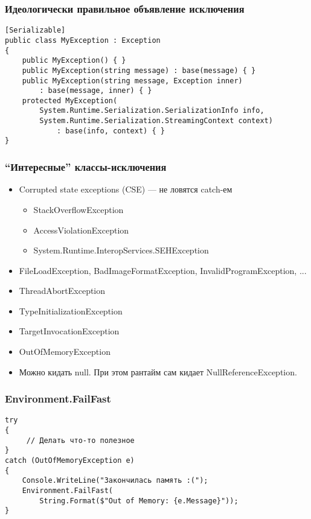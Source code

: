 \documentclass[xetex,mathserif,serif]{beamer}
\begin{document}
    \begin{frame}[fragile]
        \frametitle{Идеологически правильное объявление исключения}
        \begin{verbatim}
[Serializable]
public class MyException : Exception
{
    public MyException() { }
    public MyException(string message) : base(message) { }
    public MyException(string message, Exception inner) 
        : base(message, inner) { }
    protected MyException(
        System.Runtime.Serialization.SerializationInfo info,
        System.Runtime.Serialization.StreamingContext context)
            : base(info, context) { }
}
        \end{verbatim}
    \end{frame}

    \begin{frame}
        \frametitle{``Интересные'' классы-исключения}
        \begin{itemize}
            \item Corrupted state exceptions (CSE) --- не ловятся catch-ем
            \begin{itemize}
                \item StackOverflowException
                \item AccessViolationException
                \item System.Runtime.InteropServices.SEHException
            \end{itemize}
            \item FileLoadException, BadImageFormatException, InvalidProgramException, ...
            \item ThreadAbortException
            \item TypeInitializationException
            \item TargetInvocationException
            \item OutOfMemoryException
            \item Можно кидать null. При этом рантайм сам кидает NullReferenceException.
        \end{itemize}
    \end{frame}

    \begin{frame}[fragile]
        \frametitle{Environment.FailFast}
        \begin{verbatim}
try 
{
     // Делать что-то полезное
}
catch (OutOfMemoryException e) 
{
    Console.WriteLine("Закончилась память :(");
    Environment.FailFast(
        String.Format($"Out of Memory: {e.Message}"));
}
        \end{verbatim}
    \end{frame}
\end{document}
